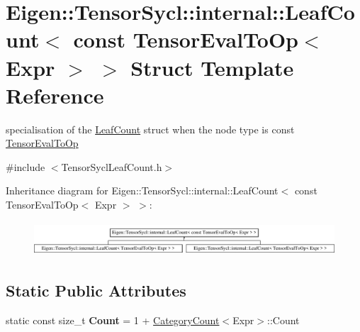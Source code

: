 \hypertarget{struct_eigen_1_1_tensor_sycl_1_1internal_1_1_leaf_count_3_01const_01_tensor_eval_to_op_3_01_expr_01_4_01_4}{}\section{Eigen\+:\+:Tensor\+Sycl\+:\+:internal\+:\+:Leaf\+Count$<$ const Tensor\+Eval\+To\+Op$<$ Expr $>$ $>$ Struct Template Reference}
\label{struct_eigen_1_1_tensor_sycl_1_1internal_1_1_leaf_count_3_01const_01_tensor_eval_to_op_3_01_expr_01_4_01_4}


specialisation of the \hyperlink{struct_eigen_1_1_tensor_sycl_1_1internal_1_1_leaf_count}{Leaf\+Count} struct when the node type is const \hyperlink{class_eigen_1_1_tensor_eval_to_op}{Tensor\+Eval\+To\+Op}  




{\ttfamily \#include $<$Tensor\+Sycl\+Leaf\+Count.\+h$>$}

Inheritance diagram for Eigen\+:\+:Tensor\+Sycl\+:\+:internal\+:\+:Leaf\+Count$<$ const Tensor\+Eval\+To\+Op$<$ Expr $>$ $>$\+:\begin{figure}[H]
\begin{center}
\leavevmode
\includegraphics[height=1.278539cm]{struct_eigen_1_1_tensor_sycl_1_1internal_1_1_leaf_count_3_01const_01_tensor_eval_to_op_3_01_expr_01_4_01_4}
\end{center}
\end{figure}
\subsection*{Static Public Attributes}
\begin{DoxyCompactItemize}
\item 
\mbox{\label{struct_eigen_1_1_tensor_sycl_1_1internal_1_1_leaf_count_3_01const_01_tensor_eval_to_op_3_01_expr_01_4_01_4_a05d32f1a4447b0982f725a95ce8c9437}} 
static const size\+\_\+t {\bfseries Count} = 1 + \hyperlink{struct_eigen_1_1_tensor_sycl_1_1internal_1_1_category_count}{Category\+Count}$<$Expr$>$\+::Count
\end{DoxyCompactItemize}


